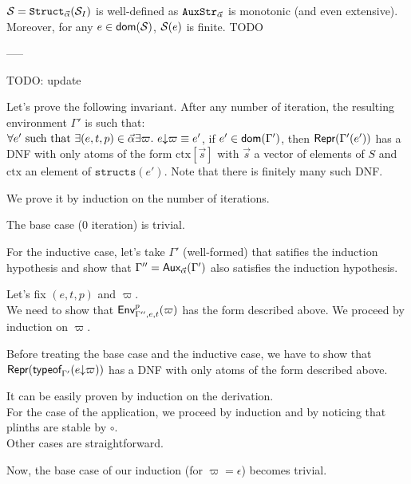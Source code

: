 \documentclass[a4paper]{article}
\theoremstyle{definition}
\begin{document}
    $\mathcal{S} = \texttt{Struct}_{\vec \alpha}(\mathcal{S}_I)$ is well-defined as $\texttt{AuxStr}_{\vec \alpha}$ is monotonic (and even extensive).
    Moreover, for any $e\in\textsf{dom}(\mathcal{S})$, $\mathcal{S}(e)$ is finite. TODO

    -----

    TODO: update

    Let's prove the following invariant. After any number of iteration, the resulting environment $\Gamma'$ is such that:\\
    $\forall e' \text{ such that } \exists (e,t,p) \in \vec \alpha \exists \varpi.\ e{\downarrow}\varpi \equiv e'$,
    if $e' \in \textsf{dom}(\Gamma')$, then $\textsf{Repr}(\Gamma'(e'))$ has a DNF with only atoms of the form
    $\text{ctx}[\vec s]$ with $\vec s$ a vector of elements of $S$ and $\text{ctx}$ an element of $\texttt{structs}(e')$.
    Note that there is finitely many such DNF.
        
    We prove it by induction on the number of iterations.

    The base case (0 iteration) is trivial.

    For the inductive case, let's take $\Gamma'$ (well-formed) that satifies the induction hypothesis
    and show that $\Gamma'' = \textsf{Aux}_{\vec \alpha}(\Gamma')$ also satisfies the induction hypothesis.

    Let's fix $(e,t,p)$ and $\varpi$.\\
    We need to show that $\textsf{Env}^{p}_{\Gamma'',e,t} (\varpi)$ has the form described above.    
    We proceed by induction on $\varpi$.

    Before treating the base case and the inductive case, we have to show that $\textsf{Repr}(\textsf{typeof}_{\Gamma'}(e{\downarrow}\varpi))$
    has a DNF with only atoms of the form described above.

    It can be easily proven by induction on the derivation.\\
    For the case of the application, we proceed by induction and by noticing that plinths are stable by $\circ$.\\
    Other cases are straightforward.

    Now, the base case of our induction (for $\varpi=\epsilon$) becomes trivial.
\end{document}
